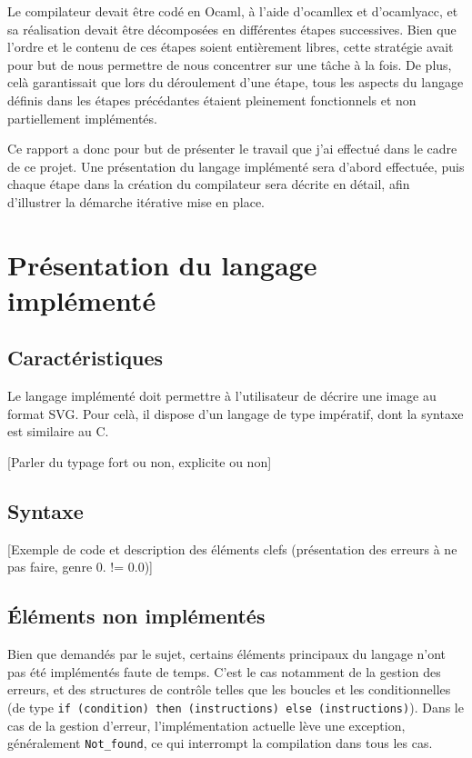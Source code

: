 \documentclass[a4paper, 12pt]{report}
\begin{document}
Le compilateur devait être codé en Ocaml, à l'aide d'ocamllex et d'ocamlyacc, et sa réalisation devait être décomposées en différentes étapes successives. Bien que l'ordre et le contenu de ces étapes soient entièrement libres, cette stratégie avait pour but de nous permettre de nous concentrer sur une tâche à la fois. De plus, celà garantissait que lors du déroulement d'une étape, tous les aspects du langage définis dans les étapes précédantes étaient pleinement fonctionnels et non partiellement implémentés.

Ce rapport a donc pour but de présenter le travail que j'ai effectué dans le cadre de ce projet. Une présentation du langage implémenté sera d'abord effectuée, puis chaque étape dans la création du compilateur sera décrite en détail, afin d'illustrer la démarche itérative mise en place.

\chapter{Présentation du langage implémenté}

	\section{Caractéristiques}
	
	Le langage implémenté doit permettre à l'utilisateur de décrire une image au format SVG. Pour celà, il dispose d'un langage de type impératif, dont la syntaxe est similaire au C.
	
	[Parler du typage fort ou non, explicite ou non]
	
	\section{Syntaxe}
	
	[Exemple de code et description des éléments clefs (présentation des erreurs à ne pas faire, genre 0. != 0.0)]
	
	\section{\'Eléments non implémentés}
	
	Bien que demandés par le sujet, certains éléments principaux du langage n'ont pas été implémentés faute de temps. C'est le cas notamment de la gestion des erreurs, et des structures de contrôle telles que les boucles et les conditionnelles (de type \texttt{if (condition) then (instructions) else (instructions)}). Dans le cas de la gestion d'erreur, l'implémentation actuelle lève une exception, généralement \texttt{Not_found}, ce qui interrompt la compilation dans tous les cas.
\end{document}
